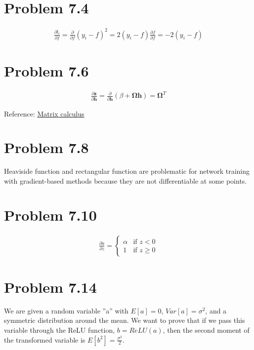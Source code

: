 \documentclass{article}
\begin{document}
\section*{Problem 7.4}
\[
\begin{aligned}
\frac{\partial l_i}{\partial f} = \frac{\partial}{\partial f} \left( y_i - f \right)^2 = 2 \left( y_i - f \right) \frac{\partial f}{\partial f} = -2 \left( y_i - f \right)
\end{aligned}
\]

\section*{Problem 7.6}
\[
\begin{aligned}
\frac{\partial \mathbf{z}}{\partial \mathbf{h}} = \frac{\partial}{\partial \mathbf{h}} \left( \beta + \mathbf{\Omega} \mathbf{h} \right) = \mathbf{\Omega}^T
\end{aligned}
\]

Reference: \href{https://en.wikipedia.org/wiki/Matrix_calculus}{Matrix calculus}

\section*{Problem 7.8}
Heaviside function and rectangular function are problematic for
network training with gradient-based methods because they are not
differentiable at some points.

\section*{Problem 7.10}
\[
\begin{aligned}
\frac{\partial a}{\partial z} = \begin{cases} 
\alpha & \text{if } z < 0 \\
1 & \text{if } z \geq 0 
\end{cases}
\end{aligned}
\]

\section*{Problem 7.14}
We are given a random variable ''a'' with \(E[a]=0\), \(Var[a]=\sigma^2\), and a symmetric distribution around the mean. We want to prove that if we pass this variable through the ReLU function, \(b=ReLU(a)\), then the second moment of the transformed variable is \(E[b^2]=\frac{\sigma^2}{2}\).
\end{document}
